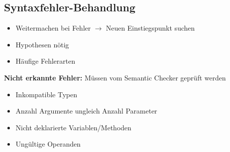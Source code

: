 \subsection{Syntaxfehler-Behandlung}
\begin{itemize}[topsep=0pt]
    \itemsep -0.2em
    \item Weitermachen bei Fehler $\rightarrow$ Neuen Einstiegspunkt suchen
    \item Hypothesen nötig
    \item Häufige Fehlerarten
\end{itemize}
\textbf{Nicht erkannte Fehler:} Müssen vom Semantic Checker geprüft werden\\
\begin{itemize}[topsep=0pt]
    \itemsep -0.2em
    \item Inkompatible Typen
    \item Anzahl Argumente ungleich Anzahl Parameter
    \item Nicht deklarierte Variablen/Methoden
    \item Ungültige Operanden
\end{itemize}